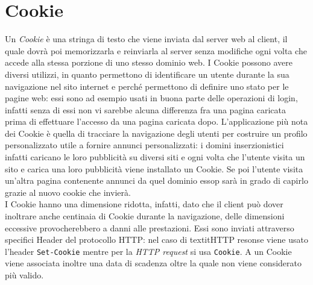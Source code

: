 \documentclass[a4paper, 12pt, twoside, openright]{book}
\begin{document}
\section{Cookie} %
Un \textit{Cookie} è una stringa di testo che viene inviata dal server web al client, il quale dovrà poi memorizzarla e reinviarla al server senza modifiche ogni volta che accede alla stessa porzione di uno stesso dominio web\cite{Wiki:cookies}. I Cookie possono avere diversi utilizzi, in quanto permettono di identificare un utente durante la sua navigazione nel sito internet e perché permettono di definire uno stato per le pagine web: essi sono ad esempio usati in buona parte delle operazioni di login, infatti senza di essi non vi sarebbe alcuna differenza fra una pagina caricata prima di effettuare l'accesso da una pagina caricata dopo. L'applicazione più nota dei Cookie è quella di tracciare la navigazione degli utenti per costruire un profilo personalizzato utile a fornire annunci personalizzati: i domini inserzionistici infatti caricano le loro pubblicità su diversi siti e ogni volta che l'utente visita un sito e carica una loro pubblicità viene installato un Cookie. Se poi l'utente visita un'altra pagina contenente annunci da quel dominio essop sarà in grado di capirlo grazie al nuovo cookie che invierà.\\
I Cookie hanno una dimensione ridotta, infatti, dato che il client può dover inoltrare anche centinaia di Cookie durante la navigazione, delle dimensioni eccessive provocherebbero a danni alle prestazioni. Essi sono inviati attraverso specifici Header del protocollo HTTP: nel caso di textit{HTTP resonse} viene usato l'header \texttt{Set-Cookie} mentre per la \textit{HTTP request} si usa \texttt{Cookie}. A un Cookie viene associata inoltre una data di scadenza oltre la quale non viene considerato più valido.\\

\end{document}

